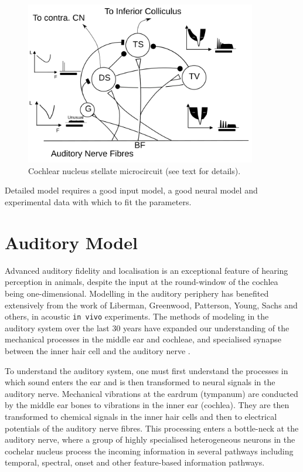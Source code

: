 \begin{figure}[htb]
  \centering
  \includegraphics[width=0.9\textwidth]{gfx/CNcircuit}
  \caption{Cochlear nucleus stellate microcircuit (see text for details). }
  \label{fig:microcircuit}
\end{figure}


\medskip{}

Detailed model requires a good input model, a good neural model and
experimental data with which to fit the parameters.  


\section{Auditory Model}



Advanced auditory fidelity and localisation is an exceptional feature
of hearing perception in animals, despite the input at the
round-window of the cochlea being one-dimensional.  Modelling in the
auditory periphery has benefited extensively from the work of
Liberman, Greenwood, Patterson, Young, Sachs and others, in acoustic
\texttt{in vivo} experiments. The methods of modeling in the auditory
system over the last 30 years have expanded our understanding of the
mechanical processes in the middle ear and cochleae, and specialised
synapse between the inner hair cell and the auditory nerve
\citep{DavisVoigt:1991,Carney:1993,MeddisHewittEtAl:1990}.


To understand the auditory system, one must first understand the
processes in which sound enters the ear and is then transformed to
neural signals in the auditory nerve. Mechanical vibrations at the
eardrum (tympanum) are conducted by the middle ear bones to vibrations
in the inner ear (cochlea). They are then transformed to chemical
signals in the inner hair cells and then to electrical potentials of
the auditory nerve fibres. This processing enters a bottle-neck at the
auditory nerve, where a group of highly specialised heterogeneous
neurons in the cochelar nucleus process the incoming information in
several pathways including temporal, spectral, onset and
other feature-based information pathways.

